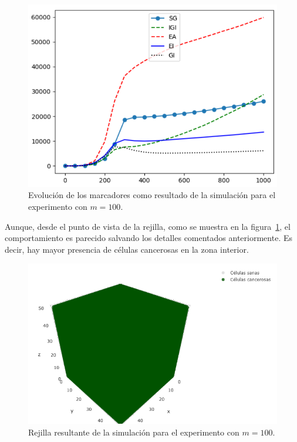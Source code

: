 \begin{figure}[h]
\centering
\includegraphics[scale=0.8]{figures/experiments/exp3/mutations}
\caption{Evolución de los marcadores como resultado de la simulación para el experimento con $m = 100$.}
\label{fig:ownexp3-2}
\end{figure}

Aunque, desde el punto de vista de la rejilla, como se muestra en la figura~\ref{fig:ownexp3-2},
el comportamiento es parecido salvando los detalles comentados anteriormente. Es decir,
hay mayor presencia de células cancerosas en la zona interior.

\begin{figure}[h]
\centering
\includegraphics[scale=0.6]{figures/experiments/exp3/grid}
\caption{Rejilla resultante de la simulación para el experimento con $m = 100$.}
\label{fig:ownexp3-3}
\end{figure}

